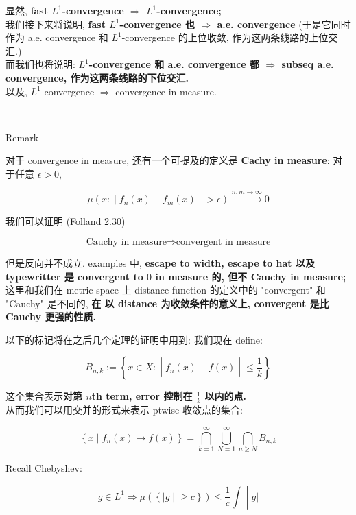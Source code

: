 \documentclass{qlnotes-export}
\begin{document}
显然, \textbf{fast \(L^{1}\)-convergence \(\Longrightarrow\) \(L^{1}\)-convergence;}\\
我们接下来将说明, \textbf{fast \(L^{1}\)-convergence 也 \(\Longrightarrow\) a.e. convergence} (于是它同时作为 a.e. convergence 和 \(L^{1}\)-convergence 的上位收敛, 作为这两条线路的上位交汇.)\\
而我们也将说明: \textbf{\(L^{1}\)-convergence 和 a.e. convergence 都 \(\Longrightarrow\) subseq a.e. convergence, 作为这两条线路的下位交汇.}\\
以及, \(L^{1}\)-convergence \(\Longrightarrow\) convergence in measure.\\
\strut \\

\begin{qlremark}{Remark}

对于 convergence in measure, 还有一个可提及的定义是 \textbf{Cachy in measure}: 对于任意 \(\epsilon > 0\),

\[\left. \mu(x: \middle| f_{n}(x) - f_{m}(x) \middle| > \epsilon)\overset{n,m\rightarrow\infty}{\rightarrow}0 \right.\]

我们可以证明 (Folland 2.30)

\[\text{Cauchy in measure}\Longrightarrow\text{convergent in measure}\]

但是反向并不成立. examples 中, \textbf{escape to width, escape to hat 以及 typewritter 是 convergent to \(0\) in measure 的, 但不 Cauchy in measure;}\\
这里和我们在 metric space 上 distance function 的定义中的 "convergent" 和 "Cauchy" 是不同的, \textbf{在 以 distance 为收敛条件的意义上, convergent 是比 Cauchy 更强的性质.}

\end{qlremark}

以下的标记将在之后几个定理的证明中用到: 我们现在 define:

\[B_{n,k} := \left\{ x \in X: \middle| f_{n}(x) - f(x) \middle| \leq \frac{1}{k} \right\}\]

这个集合表示\textbf{对第 \(n\)th term, error 控制在 \(\frac{1}{k}\) 以内的点.}\\
从而我们可以用交并的形式来表示 ptwise 收敛点的集合:

\[\left\{ {x \mid f_{n}(x)\rightarrow f(x)} \right\} = \bigcap\limits_{k = 1}^{\infty}\bigcup\limits_{N = 1}^{\infty}\bigcap\limits_{n \geq N}B_{n,k}\]

Recall Chebyshev:

\[\left. g \in L^{1}\Longrightarrow\mu(\left\{ |g \middle| \geq c \right\}) \leq \frac{1}{c}\int \middle| g| \right.\]
\end{document}
